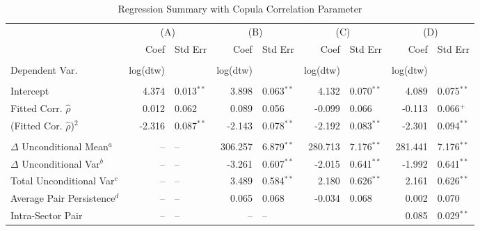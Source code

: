 \documentclass[12pt]{report}
\begin{document}
\begin{table}
    \fontsize{8pt}{8pt}\selectfont
    \caption{Regression Summary with Copula Correlation Parameter}
    \centering
    \begin{tabular}{l r l r l r l r l}
        \midrule
         & \multicolumn{2}{c}{(A)} & \multicolumn{2}{c}{(B)} & \multicolumn{2}{c}{(C)} & \multicolumn{2}{c}{(D)}  \\
         & Coef & Std Err & Coef & Std Err & Coef & Std Err & Coef & Std Err  \\
        \midrule
                                                                                                                                                \\
        Dependent Var.                     & log(dtw)&              & log(dtw)&              & log(dtw)&              & log(dtw)&               \\
                                                                                                                                                \\
        Intercept                          &   4.374 & 0.013$^{**}$ &   3.898 & 0.063$^{**}$ &   4.132 & 0.070$^{**}$ &   4.089 & 0.075$^{**}$  \\
        Fitted Corr. $\hat{\rho}$          &   0.012 & 0.062        &   0.089 & 0.056        &  -0.099 & 0.066        &  -0.113 & 0.066$^{+}$   \\
        (Fitted Cor. $\hat{\rho}$)$^{2}$   &  -2.316 & 0.087$^{**}$ &  -2.143 & 0.078$^{**}$ &  -2.192 & 0.083$^{**}$ &  -2.301 & 0.094$^{**}$  \\  \\        
        $\Delta$ Unconditional Mean$^{a}$  &      -- & --           & 306.257 & 6.879$^{**}$ & 280.713 & 7.176$^{**}$ & 281.441 & 7.176$^{**}$  \\
        $\Delta$ Unconditional Var$^{b}$   &      -- & --           &  -3.261 & 0.607$^{**}$ &  -2.015 & 0.641$^{**}$ &  -1.992 & 0.641$^{**}$  \\
        Total Unconditional Var$^{c}$      &      -- & --           &   3.489 & 0.584$^{**}$ &   2.180 & 0.626$^{**}$ &   2.161 & 0.626$^{**}$  \\
        Average Pair Persistence$^{d}$     &      -- & --           &   0.065 & 0.068        &  -0.034 & 0.068        &   0.002 & 0.070         \\
        Intra-Sector Pair                  &      -- & --           &      -- & --           &         &              &   0.085 & 0.029$^{**}$  \\

\end{tabular}
\end{table}
\end{document}
